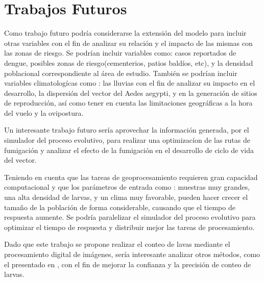 \chapter{Trabajos Futuros}
Como trabajo futuro podría considerarse la extensión del modelo para incluir otras variables
con el fin de analizar su relación y el impacto de las mismas con las zonas de riesgo. Se podrían
incluir variables como: casos reportados de dengue, posibles zonas de riesgo(cementerios, patios
baldíos, etc), y la densidad poblacional correspondiente al área de estudio. También se podrían
incluir variables climatologícas como : las lluvias con el fin de analizar su impacto en el
desarrollo, la dispersión del vector del Aedes aegypti, y en la generación de sitios de
reproducción, así como tener en cuenta las limitaciones geográficas a la hora del vuelo y la
ovipostura.

Un interesante trabajo futuro sería aprovechar la información generada, por el simulador del
proceso evolutivo, para realizar una optimizacíon de las rutas de fumigación y analizar el efecto
de la fumigación en el desarrollo de ciclo de vida del vector.

Teniendo en cuenta que las tareas de geoprocesamiento requieren gran capacidad computacional y que
los parámetros de entrada como : muestras muy grandes, una alta densidad de larvas, y un
clima muy favorable, pueden hacer crecer el tamaño de la población de forma considerable, causando
que el tiempo de respuesta aumente. Se podría paralelizar el simulador del proceso evolutivo para
optimizar el tiempo de respuesta y distribuir mejor las tareas de procesamiento.

Dado que este trabajo se propone realizar el conteo de lavas mediante el procesamiento digital de
imágenes, sería interesante analizar otros métodos, como el presentado en
\cite{gonzalez2008segmentacion}, con el fin de mejorar la confianza y la precisión de conteo de
larvas.
